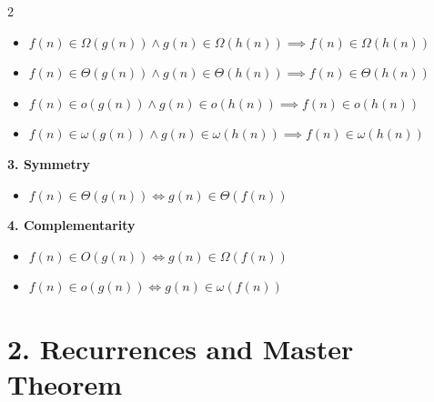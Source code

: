\documentclass[10pt,landscape]{article}
\begin{document}
\begin{multicols*}{2}
\begin{itemize}
    \item $f(n) \in \Omega(g(n)) \land g(n) \in \Omega(h(n)) \implies f(n) \in \Omega(h(n))$
    \item $f(n) \in \Theta(g(n)) \land g(n) \in \Theta(h(n)) \implies f(n) \in \Theta(h(n))$
    \item $f(n) \in o(g(n)) \land g(n) \in o(h(n)) \implies f(n) \in o(h(n))$
    \item $f(n) \in \omega(g(n)) \land g(n) \in \omega(h(n)) \implies f(n) \in \omega(h(n))$
\end{itemize}
\vspace{8pt}
\textbf{3. Symmetry}
\begin{itemize}
    \item $f(n) \in \Theta(g(n)) \iff g(n) \in \Theta(f(n))$
\end{itemize}
\vspace{8pt}
\textbf{4. Complementarity}
\begin{itemize}
    \item $f(n) \in O(g(n)) \iff g(n) \in \Omega(f(n))$
    \item $f(n) \in o(g(n)) \iff g(n) \in \omega(f(n))$
\end{itemize}

\hrulefill

\section*{2. Recurrences and Master Theorem}


\end{multicols*}
\end{document}
